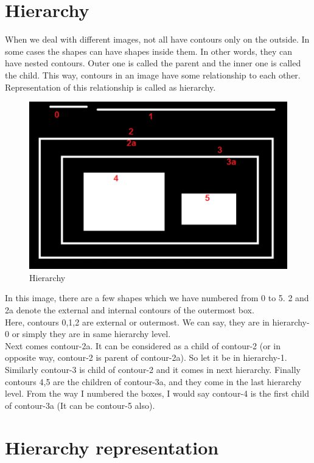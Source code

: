 \documentclass[]{article}
\begin{document}
\section{Hierarchy}\label{hierarchy}

When we deal with different images, not all have contours only on the
outside. In some cases the shapes can have shapes inside them. In other
words, they can have nested contours. Outer one is called the parent and
the inner one is called the child. This way, contours in an image have
some relationship to each other. Representation of this relationship is
called as hierarchy.

\begin{figure}[htbp]
\centering
\includegraphics{cont1.png}
\caption{Hierarchy}
\end{figure}

In this image, there are a few shapes which we have numbered from 0 to
5. 2 and 2a denote the external and internal contours of the outermost
box.\\
Here, contours 0,1,2 are external or outermost. We can say, they are in
hierarchy-0 or simply they are in same hierarchy level.\\
Next comes contour-2a. It can be considered as a child of contour-2 (or
in opposite way, contour-2 is parent of contour-2a). So let it be in
hierarchy-1. Similarly contour-3 is child of contour-2 and it comes in
next hierarchy. Finally contours 4,5 are the children of contour-3a, and
they come in the last hierarchy level. From the way I numbered the
boxes, I would say contour-4 is the first child of contour-3a (It can be
contour-5 also).

\section{Hierarchy representation}\label{hierarchy-representation}
\end{document}
